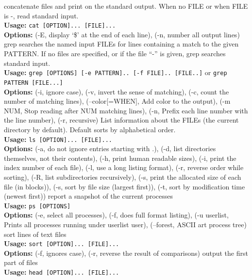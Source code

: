 \documentclass[number]{notes}
\begin{document}
\begin{landscape}
\begin{multicols}{3}
\newpage{}
concatenate files and print on the standard output. When no FILE or when FILE is -, read standard input.\\
\textbf{Usage:} \texttt{cat [OPTION]... [FILE]...}\\
\textbf{Options:} (-E, display `\$' at the end of each line), (-n, number all output lines)
grep searches the named input FILEs for lines containing a match to the given PATTERN. If no files are specified, or if the file ``-'' is given, grep searches standard input.\\
\textbf{Usage:} \texttt{grep [OPTIONS] [-e PATTERN].. [-f FILE].. [FILE..]} or \texttt{grep PATTERN [FILE...]}\\
\textbf{Options:} (-i, ignore case), (-v, invert the sense of matching), (-c, count the number of matching lines), (--color[=WHEN], Add color to the output), (-m NUM, Stop reading after NUM matching lines), (-n, Prefix each line number with the line number), (-r, recursive)
List information about the FILEs (the current directory by default). Default sorts by alphabetical order.\\
\textbf{Usage:} \texttt{ls [OPTION]... [FILE]...}\\
\textbf{Options:} (-a, do not ignore entries starting with .), (-d, list directories themselves, not their contents), (-h, print human readable sizes), (-i, print the index number of each file), (-l, use a long listing format), (-r, reverse order while sorting), (-R, list subdirectories recursively), (-s, print the allocated size of each file (in blocks)), (-s, sort by file size (largest first)), (-t, sort by modification time (newest first))
report a snapshot of the current processes\\
\textbf{Usage:} \texttt{ps [OPTIONS]}\\
\textbf{Options:} (-e, select all processes), (-f, does full format listing), (-u userlist, Prints all processes running under userlist user), (--forest, ASCII art process tree)
sort lines of text files\\
\textbf{Usage:} \texttt{sort [OPTION]... [FILE]...}\\
\textbf{Options:} (-f, ignores case), (-r, reverse the result of comparisons)
output the first part of files\\
\textbf{Usage:} \texttt{head [OPTION]... [FILE]...}\\

\end{multicols}
\end{landscape}
\end{document}
